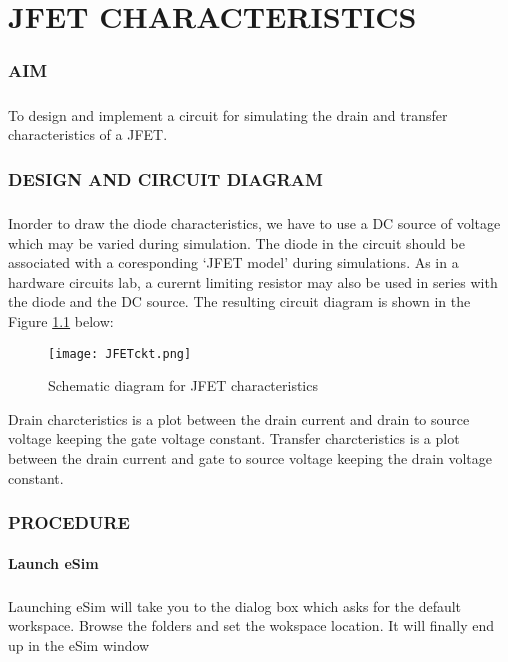 \chapter{JFET CHARACTERISTICS}

\subsection*{AIM}
\paragraph{}To design and implement a circuit for simulating the drain and transfer characteristics of a JFET.

\subsection*{DESIGN AND CIRCUIT DIAGRAM}
\paragraph{}

Inorder to draw the diode characteristics, we have to use a DC source of voltage which may be varied during simulation. The diode in the circuit should be associated with a coresponding `JFET model' during  simulations. As in a hardware circuits lab, a curernt limiting resistor may also be used in series with the diode and the DC source. The resulting circuit diagram is shown in the Figure \ref{JFETckt}  below:
\begin{figure}[h]
\centering
\texttt{[image: JFETckt.png]}
\caption{Schematic diagram for JFET characteristics}
\label{JFETckt}
\end{figure}

Drain charcteristics is a plot between the drain current and drain to source voltage keeping the gate voltage constant. Transfer charcteristics is a plot between the drain current and gate to source voltage keeping the drain voltage constant.

\subsection*{PROCEDURE}

\subsubsection{Launch eSim}

\paragraph{}
 Launching eSim will take you to the dialog box which asks for the default workspace. Browse the folders and set the wokspace location. It will finally end up in the eSim window %

